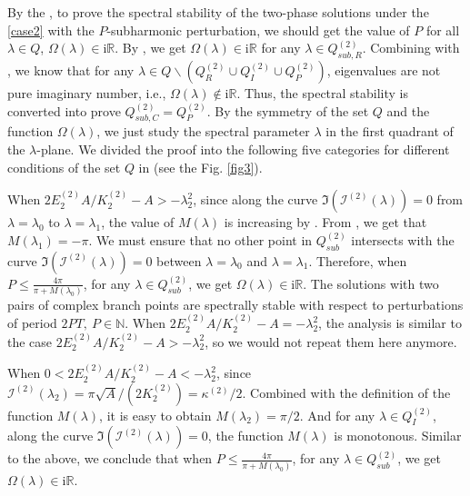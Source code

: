 \documentclass[11pt,reqno]{amsart}
\newcommand{\ii}{\mathrm{i}}
\numberwithin{equation}{section}
\begin{document}
\newenvironment{proof-spec-cn-P}{\emph{Proof of \Cref{theorem:spectral-complex-P}.}}{\hfill$\Box$\medskip}
\begin{proof-spec-cn-P}
	By the , to prove the spectral stability of the two-phase solutions under the \ref{case2} with the $P$-subharmonic perturbation, we should get the value of $P$ for all $\lambda\in Q$, $\Omega(\lambda)\in \ii \mathbb{R}$.
	By , we get $\Omega(\lambda)\in \ii \mathbb{R}$ for any $\lambda\in Q^{(2)}_{sub,R}$. 
	Combining with , we know that for any $\lambda\in Q \backslash ( Q^{(2)} _{R}\cup  Q^{(2)} _{I}\cup  Q^{(2)} _{P})$,  eigenvalues are not pure imaginary number, i.e., $\Omega(\lambda)\notin \ii \mathbb{R}$.  Thus, the spectral stability is converted into prove $Q^{(2)}_{sub,C}=  Q^{(2)} _{P}$. 
	By the symmetry of the set $Q$ and the function $\Omega(\lambda)$, we just study the spectral parameter $\lambda$ in the first quadrant of the $\lambda$-plane.
	We divided the proof into the following five categories for different conditions of the set $Q$ in  (see the Fig. \ref{fig3}).
	
	When $2 E^{(2)}_2A/  K^{(2)}_2-A>-\lambda_2^2$, since along the curve ${\Im}( \mathcal{I}^{(2)} (\lambda))=0$ from $\lambda=\lambda_0$ to $\lambda=\lambda_1$, the value of $M(\lambda)$ is increasing by . 
	From , we get that $M(\lambda_1)=-\pi$. 
	We must ensure that no other point in $Q^{(2)}_{sub}$ intersects with the curve ${\Im}( \mathcal{I}^{(2)} (\lambda))=0$ between $\lambda=\lambda_0$ and $\lambda=\lambda_1$. 
	Therefore, when $P\le \frac{4\pi}{\pi+ M(\lambda_0)}$, for any $\lambda\in Q^{(2)}_{sub}$, we get $\Omega(\lambda)\in \ii \mathbb{R}$. The solutions with two pairs of complex branch points are spectrally stable with respect to perturbations of period $2PT, \ P\in \mathbb{N}$.
	When $2 E^{(2)}_2A/  K^{(2)}_2-A=-\lambda_2^2$, the analysis is similar to the case $2 E^{(2)}_2A/  K^{(2)}_2-A>-\lambda_2^2$, so we would not repeat them here anymore.
	
	When $0 < 2 E^{(2)}_2A/  K^{(2)}_2-A<-\lambda_2^2$, since $ \mathcal{I}^{(2)} (\lambda_2)=\pi \sqrt{A}/(2  K^{(2)}_2)=\kappa^{(2)}/2$. Combined with the definition of the function $M(\lambda)$, it is easy to obtain $M(\lambda_2)=\pi/2$. 
	And for any $\lambda\in  Q^{(2)} _I$, along the curve $\Im( \mathcal{I}^{(2)} (\lambda))=0$, the function $M(\lambda)$ is monotonous.
	Similar to the above, we conclude that when $P\le \frac{4\pi}{\pi+ M(\lambda_0)}$, for any $\lambda\in Q^{(2)}_{sub}$, we get $\Omega(\lambda)\in \ii \mathbb{R}$. 
	

\end{proof-spec-cn-P}
\end{document}
